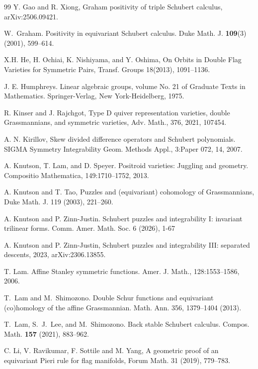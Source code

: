 \documentclass[12pt,reqno]{amsart}
\numberwithin{equation}{section}
\theoremstyle{definition}
\begin{document}
\begin{thebibliography}{99}
Y. Gao and R. Xiong, Graham positivity of triple Schubert calculus, 	arXiv:2506.09421.


W.~Graham.
\newblock Positivity in equivariant Schubert calculus.
\newblock Duke Math. J. \textbf{109}(3) (2001), 599--614.


X.H. He, H. Ochiai,  K. Nishiyama, and Y. Oshima, On Orbits in Double Flag Varieties for Symmetric Pairs, Transf. Groups 18(2013), 1091–1136.
 
J. E. Humphreys. Linear algebraic groups, volume No. 21 of Graduate Texts in Mathematics.
Springer-Verlag, New York-Heidelberg, 1975.




R. Kinser and J. Rajchgot,
Type D quiver representation varieties, double Grassmannians, and symmetric varieties, Adv. Math., 376, 2021, 107454.


A. N. Kirillov, Skew divided difference operators and Schubert polynomials. SIGMA Symmetry
Integrability Geom. Methods Appl., 3:Paper 072, 14, 2007.


A. Knutson, T. Lam, and D. Speyer. Positroid varieties: Juggling and geometry.  Compositio Mathematica, 149:1710–1752, 2013.



A. Knutson and T. Tao, Puzzles and (equivariant) cohomology of Grassmannians, Duke Math. J. 119
(2003),   221--260.

A. Knutson and P. Zinn-Justin. Schubert puzzles and integrability I: invariant trilinear forms. Comm. Amer. Math. Soc. 6 (2026), 1-67

A. Knutson and P. Zinn-Justin, Schubert puzzles and integrability III: separated descents, 2023, arXiv:2306.13855. 


T. Lam. Affine Stanley symmetric functions. Amer. J. Math.,  128:1553–1586, 2006.

T.~Lam and M.~Shimozono.
\newblock Double Schur functions and equivariant (co)homology of the affine Grassmannian. 
\newblock Math. Ann. 356, 1379–1404 (2013). 

T.~Lam, S.~J.~Lee, and M.~Shimozono.
\newblock Back stable Schubert calculus.
\newblock Compos. Math. \textbf{157} (2021), 883--962.


C. Li, V. Ravikumar, F. Sottile and M. Yang, A geometric proof of an equivariant Pieri rule for flag manifolds, Forum Math.  31 (2019), 779--783.



\end{thebibliography}
\end{document}
